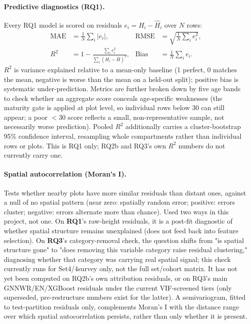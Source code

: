 \documentclass[11pt,a4paper]{report}
\begin{document}
\paragraph*{Predictive diagnostics (RQ1).}
Every RQ1 model is scored on residuals $e_i = H_i - \hat H_i$ over $N$ rows:
\begin{align*}
\text{MAE} &= \frac{1}{N}\sum_i |e_i|, &
\text{RMSE} &= \sqrt{\frac{1}{N}\sum_i e_i^2}, \\
R^2 &= 1 - \frac{\sum_i e_i^2}{\sum_i (H_i - \bar H)^2}, &
\text{Bias} &= \frac{1}{N}\sum_i e_i.
\end{align*}
$R^2$ is variance explained relative to a mean-only baseline (1 perfect, 0 matches the mean,
negative is worse than the mean on a held-out split); positive bias is systematic
under-prediction. Metrics are further broken down by five age bands to check whether an
aggregate score conceals age-specific weaknesses (the maturity gate is applied at plot level, so
individual rows below 30 can still appear; a poor $<30$ score reflects a small, non-representative
sample, not necessarily worse prediction). Pooled $R^2$ additionally carries a cluster-bootstrap
95\% confidence interval, resampling whole compartments rather than individual rows or plots. This
is RQ1 only; RQ2b and RQ3's own $R^2$ numbers do not currently carry one.

\paragraph*{Spatial autocorrelation (Moran's I).}
Tests whether nearby plots have more similar residuals than distant ones, against a null of no
spatial pattern (near zero: spatially random error; positive: errors cluster; negative: errors
alternate more than chance). Used two ways in this project, not one. On \textbf{RQ1}'s raw-height
residuals, it is a post-fit diagnostic of whether spatial structure remains unexplained (does not
feed back into feature selection). On \textbf{RQ3}'s category-removal check, the question shifts
from "is spatial structure gone" to "does removing this variable category raise residual
clustering," diagnosing whether that category was carrying real spatial signal; this check
currently runs for Set4/4survey only, not the full set/cohort matrix. It has not yet been computed
on RQ2b's own attribution residuals, or on RQ3's main GNNWR/EN/XGBoost residuals under the current
VIF-screened tiers (only superseded, pre-restructure numbers exist for the latter). A
semivariogram, fitted to test-partition residuals only, complements Moran's I with the distance
range over which spatial autocorrelation persists, rather than only whether it is present.
\end{document}
